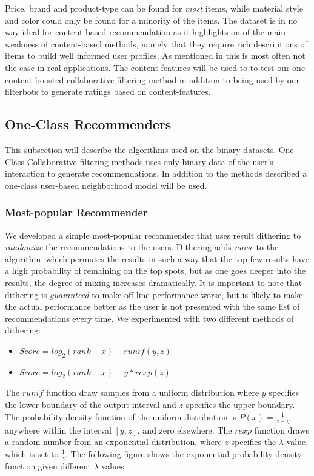 Price, brand and product-type can be found for \emph{most} items, while material style
and color could only be found for a minority of the items. The dataset is in no way ideal
for content-based recommendation as it highlights on of the main weakness of content-based
methods, namely that they require rich descriptions of items to build well informed user
profiles. As mentioned in \cite{meyer2012recommender} this is most often not the case in
real applications. The content-features will be used to to test our one content-boosted collaborative
filtering method \cite{Gantner2010} in addition to being used by our filterbots to generate ratings based
on content-features.

\subsection{One-Class Recommenders}

This subsection will describe the algorithms used on the binary datasets. One-Class Collaborative
filtering methods uses only binary data of the user's interaction to generate recommendations.
In addition to the methods described a one-class user-based neighborhood model will be used.

\subsubsection{Most-popular Recommender}

We developed a simple most-popular recommender that uses result dithering to \emph{randomize}
the recommendations to the users. Dithering adds \emph{noise} to the algorithm, which permutes
the results in such a way that the top few results have a high probability of remaining on the top spots,
but as one goes deeper into the results, the degree of mixing increases dramatically. It is important to
note that dithering is \emph{guaranteed} to make off-line performance worse, but is likely to make the
actual performance better as the user is not presented with the same list of recommendations every
time. We experimented with two different methods of dithering:

\begin{itemize}
\item $Score = log_2(rank+x) - runif(y, z)$
\item $Score = log_2(rank+x) - y*rexp(z)$
\end{itemize}

The $runif$ function draw samples from a uniform distribution where $y$ specifies the lower boundary
of the output interval and $z$ specifies the upper boundary. The probability density function of the
uniform distribution is $P(x) = \frac{1}{z-y}$ anywhere within the interval $[y, z]$, and zero elsewhere.
The $rexp$ function draws a random number from an exponential distribution, where $z$ specifies the
$\lambda$ value, which is set to $\frac{1}{z}$. The following figure shows the exponential probability
density function given different $\lambda$ values:

